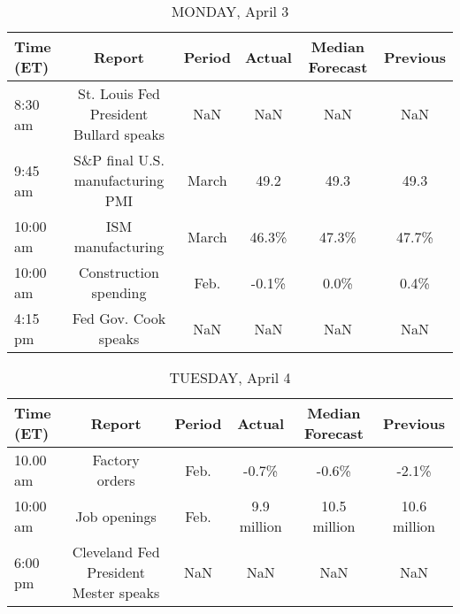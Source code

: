 \documentclass{article}%
\begin{document}
%
\normalsize%


\begin{table}[htbp]%
\caption{MONDAY, April 3}%
\centering%
\begin{adjustbox}{width=1\textwidth}%
\begin{tabular}{lccccc}
\toprule
Time (ET) &                                 Report & Period & Actual & Median Forecast & Previous \\
\midrule
  8:30 am & St. Louis Fed President Bullard speaks &    NaN &    NaN &             NaN &      NaN \\
  9:45 am &       S\&P final U.S. manufacturing PMI &  March &   49.2 &            49.3 &     49.3 \\
 10:00 am &                      ISM manufacturing &  March &  46.3\% &           47.3\% &    47.7\% \\
 10:00 am &                  Construction spending &   Feb. &  -0.1\% &            0.0\% &     0.4\% \\
  4:15 pm &                   Fed Gov. Cook speaks &    NaN &    NaN &             NaN &      NaN \\
\bottomrule
\end{tabular}
%
\end{adjustbox}%
\end{table}

%


\begin{table}[htbp]%
\caption{TUESDAY, April 4}%
\centering%
\begin{adjustbox}{width=1\textwidth}%
\begin{tabular}{lccccc}
\toprule
Time (ET) &                                Report & Period &      Actual & Median Forecast &     Previous \\
\midrule
 10.00 am &                        Factory orders &   Feb. &       -0.7\% &           -0.6\% &        -2.1\% \\
 10:00 am &                          Job openings &   Feb. & 9.9 million &    10.5 million & 10.6 million \\
  6:00 pm & Cleveland Fed President Mester speaks &    NaN &         NaN &             NaN &          NaN \\
\bottomrule
\end{tabular}
%
\end{adjustbox}%
\end{table}

%
\end{document}
